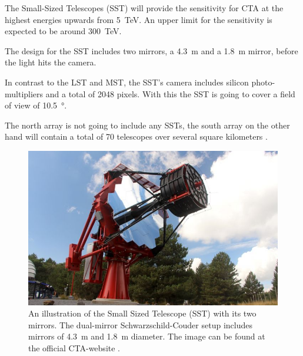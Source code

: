 The Small-Sized Telescopes (SST) will provide the sensitivity for CTA at the 
highest energies upwards from \SI{5}{\tera\electronvolt}.
An upper limit for the sensitivity is expected to be around \SI{300}{\tera\electronvolt}.

The design for the SST includes two mirrors, a \SI{4.3}{\meter} and a \SI{1.8}{\meter}
mirror, before the light hits the camera.

In contrast to the LST and MST, the SST's camera includes silicon photo-multipliers
and a total of 2048 pixels. With this the SST is going to cover a field of view 
of \SI{10.5}{\degree}.

The north array is not going to include any SSTs, the 
south array on the other hand will contain a total of 70 telescopes over
several square kilometers \cite{cta_web}.

\begin{figure}
		\centering
		\captionsetup{width=0.9\linewidth}
		\includegraphics[width=.4\textwidth]{images/sst.jpg}
		\caption{An illustration of the Small Sized Telescope (SST) with its
		two mirrors.
		The dual-mirror Schwarzschild-Couder setup includes mirrors of
		\SI{4.3}{\meter} and \SI{1.8}{\meter} diameter.
		The image can be found at the official CTA-website \cite{cta_web}.}
		\label{fig:sst}
\end{figure}